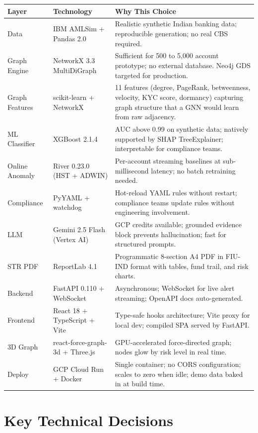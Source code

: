 \documentclass[10pt,a4paper]{article}
\begin{document}
\begin{tabularx}{\linewidth}{L{1.7cm} L{4.0cm} X}
\toprule
\textbf{Layer} & \textbf{Technology} & \textbf{Why This Choice} \\
\midrule
Data & IBM AMLSim + Pandas 2.0 & Realistic synthetic Indian banking data; reproducible generation; no real CBS required. \\[1pt]
Graph Engine & NetworkX 3.3 MultiDiGraph & Sufficient for 500 to 5,000 account prototype; no external database. Neo4j GDS targeted for production. \\[1pt]
Graph Features & scikit-learn + NetworkX & 11 features (degree, PageRank, betweenness, velocity, KYC score, dormancy) capturing graph structure that a GNN would learn from raw adjacency. \\[1pt]
ML Classifier & XGBoost 2.1.4 & AUC above 0.99 on synthetic data; natively supported by SHAP TreeExplainer; interpretable for compliance teams. \\[1pt]
Online Anomaly & River 0.23.0 (HST + ADWIN) & Per-account streaming baselines at sub-millisecond latency; no batch retraining needed. \\[1pt]
Compliance & PyYAML + watchdog & Hot-reload YAML rules without restart; compliance teams update rules without engineering involvement. \\[1pt]
LLM & Gemini 2.5 Flash (Vertex AI) & GCP credits available; grounded evidence block prevents hallucination; fast for structured prompts. \\[1pt]
STR PDF & ReportLab 4.1 & Programmatic 8-section A4 PDF in FIU-IND format with tables, fund trail, and risk charts. \\[1pt]
Backend & FastAPI 0.110 + WebSocket & Asynchronous; WebSocket for live alert streaming; OpenAPI docs auto-generated. \\[1pt]
Frontend & React 18 + TypeScript + Vite & Type-safe hooks architecture; Vite proxy for local dev; compiled SPA served by FastAPI. \\[1pt]
3D Graph & react-force-graph-3d + Three.js & GPU-accelerated force-directed graph; nodes glow by risk level in real time. \\[1pt]
Deploy & GCP Cloud Run + Docker & Single container; no CORS configuration; scales to zero when idle; demo data baked in at build time. \\
\bottomrule
\end{tabularx}

\section{Key Technical Decisions}
\end{document}
